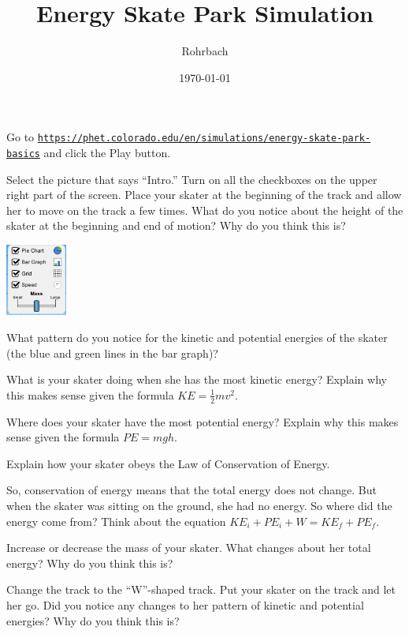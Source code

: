 \documentclass[10pt]{exam}
\title{Energy Skate Park Simulation}
\author{Rohrbach}
\date{\today}
\begin{document}
\maketitle


\noindent
Go to \texttt{\href{https://phet.colorado.edu/en/simulations/energy-skate-park-basics}{https://phet.colorado.edu/en/simulations/energy-skate-park-basics}} and click the Play button.

\begin{questions}

\question
	Select the picture that says ``Intro.''  Turn on all the checkboxes on the upper right part of the screen. Place your skater at the beginning of the track and allow her to move on the track a few times.  What do you notice about the height of the skater at the beginning and end of motion?  Why do you think this is?
  
  \begin{flushright}
    \includegraphics[width=2cm]{PhET_checkboxes.png}
  \end{flushright}

\question
	What pattern do you notice for the kinetic and potential energies of the skater (the blue and green lines in the bar graph)?
  \vs

\question
	What is your skater doing when she has the most kinetic energy?  Explain why this makes sense given the formula $KE=\frac{1}{2}mv^2$.
  \vs 

\question
	Where does your skater have the most potential energy?  Explain why this makes sense given the formula $PE=mgh$.
  \vs 

\question
	Explain how your skater obeys the Law of Conservation of Energy.
  \vs 

\question
	So, conservation of energy means that the total energy does not change.  But when the skater was sitting on the ground, she had no energy.  So where did the energy come from?  Think about the equation $KE_i+PE_i+W=KE_f+PE_f$.
  \vs 

\pagebreak

\question
  Increase or decrease the mass of your skater.  What changes about her total energy?  Why do you think this is?
  \vs

\question
	Change the track to the ``W''-shaped track.  Put your skater on the track and let her go.  Did you notice any changes to her pattern of kinetic and potential energies?   Why do you think this is?
  

\end{questions}
\end{document}
